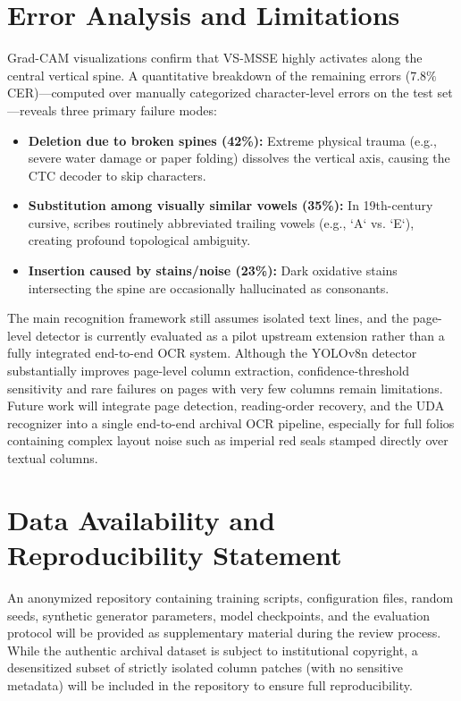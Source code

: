 \documentclass[11pt]{article}
\begin{document}
\section{Error Analysis and Limitations}
Grad-CAM visualizations confirm that VS-MSSE highly activates along the central vertical spine. A quantitative breakdown of the remaining errors ($7.8\%$ CER)—computed over manually categorized character-level errors on the test set—reveals three primary failure modes:
\begin{itemize}[noitemsep,topsep=0pt]
    \item \textbf{Deletion due to broken spines (42\%):} Extreme physical trauma (e.g., severe water damage or paper folding) dissolves the vertical axis, causing the CTC decoder to skip characters.
    \item \textbf{Substitution among visually similar vowels (35\%):} In 19th-century cursive, scribes routinely abbreviated trailing vowels (e.g., `A` vs. `E`), creating profound topological ambiguity.
    \item \textbf{Insertion caused by stains/noise (23\%):} Dark oxidative stains intersecting the spine are occasionally hallucinated as consonants.
\end{itemize}
The main recognition framework still assumes isolated text lines, and the page-level detector is currently evaluated as a pilot upstream extension rather than a fully integrated end-to-end OCR system. Although the YOLOv8n detector substantially improves page-level column extraction, confidence-threshold sensitivity and rare failures on pages with very few columns remain limitations. Future work will integrate page detection, reading-order recovery, and the UDA recognizer into a single end-to-end archival OCR pipeline, especially for full folios containing complex layout noise such as imperial red seals stamped directly over textual columns.

\section{Data Availability and Reproducibility Statement}
An anonymized repository containing training scripts, configuration files, random seeds, synthetic generator parameters, model checkpoints, and the evaluation protocol will be provided as supplementary material during the review process. While the authentic archival dataset is subject to institutional copyright, a desensitized subset of strictly isolated column patches (with no sensitive metadata) will be included in the repository to ensure full reproducibility.
\end{document}
